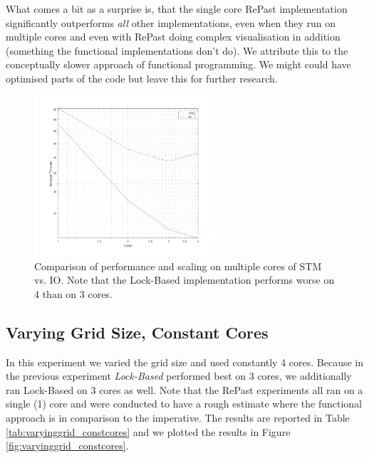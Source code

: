 What comes a bit as a surprise is, that the single core RePast implementation significantly outperforms \textit{all} other implementations, even when they run on multiple cores and even with RePast doing complex visualisation in addition (something the functional implementations don't do). We attribute this to the conceptually slower approach of functional programming. We might could have optimised parts of the code but leave this for further research.

\begin{figure}
	\centering
	\includegraphics[width=0.6\textwidth, angle=0]{./fig/sir/core_duration_stm_io.png}
	\caption{Comparison of performance and scaling on multiple cores of STM vs. IO. Note that the Lock-Based implementation performs worse on 4 than on 3 cores.}
	\label{fig:core_duration_stm_io}
\end{figure}

\subsection{Varying Grid Size, Constant Cores}
In this experiment we varied the grid size and used constantly 4 cores. Because in the previous experiment \textit{Lock-Based} performed best on 3 cores, we additionally ran Lock-Based on 3 cores as well. Note that the RePast experiments all ran on a single (1) core and were conducted to have a rough estimate where the functional approach is in comparison to the imperative. The results are reported in Table \ref{tab:varyinggrid_constcores} and we plotted the results in Figure \ref{fig:varyinggrid_constcores}.

